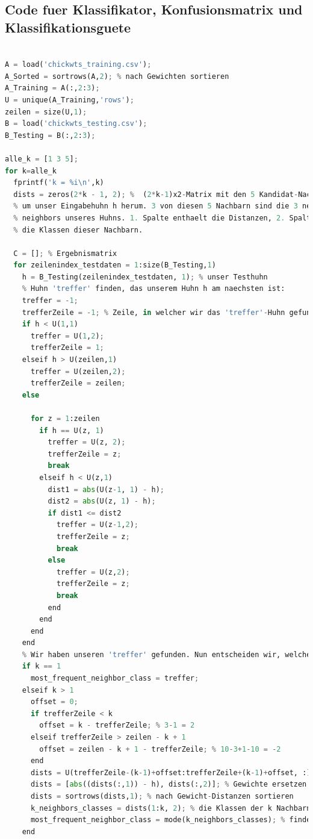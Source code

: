 \documentclass[12pt]{article}
\begin{document}
\subsection{Code fuer Klassifikator, Konfusionsmatrix und Klassifikationsguete}
\begin{lstlisting}[language=Python]
% Spalte 1 = Huhn-ID, Spalte 2 = Gewicht, Spalte 3 = Futterklasse

A = load('chickwts_training.csv');
A_Sorted = sortrows(A,2); % nach Gewichten sortieren
A_Training = A(:,2:3);
U = unique(A_Training,'rows');
zeilen = size(U,1);
B = load('chickwts_testing.csv');
B_Testing = B(:,2:3);

alle_k = [1 3 5];
for k=alle_k
  fprintf('k = %i\n',k)
  dists = zeros(2*k - 1, 2); %  (2*k-1)x2-Matrix mit den 5 Kandidat-Nachbarn 
  % um unser Eingabehuhn h herum. 3 von diesen 5 Nachbarn sind die 3 nearest 
  % neighbors unseres Huhns. 1. Spalte enthaelt die Distanzen, 2. Spalte enthaelt
  % die Klassen dieser Nachbarn.
  
  C = []; % Ergebnismatrix
  for zeilenindex_testdaten = 1:size(B_Testing,1)
    h = B_Testing(zeilenindex_testdaten, 1); % unser Testhuhn
    % Huhn 'treffer' finden, das unserem Huhn h am naechsten ist:
    treffer = -1;
    trefferZeile = -1; % Zeile, in welcher wir das 'treffer'-Huhn gefunden haben
    if h < U(1,1)
      treffer = U(1,2);
      trefferZeile = 1;
    elseif h > U(zeilen,1)
      treffer = U(zeilen,2);
      trefferZeile = zeilen;
    else
    
      for z = 1:zeilen
        if h == U(z, 1)
          treffer = U(z, 2);
          trefferZeile = z;
          break
        elseif h < U(z,1)
          dist1 = abs(U(z-1, 1) - h);
          dist2 = abs(U(z, 1) - h);
          if dist1 <= dist2
            treffer = U(z-1,2);
            trefferZeile = z;
            break
          else
            treffer = U(z,2);
            trefferZeile = z;
            break
          end
        end
      end  
    end
    % Wir haben unseren 'treffer' gefunden. Nun entscheiden wir, welche Huehner um ihn herum unsere k naechsten Nachbarn sind.
    if k == 1
      most_frequent_neighbor_class = treffer;
    elseif k > 1
      offset = 0;
      if trefferZeile < k
        offset = k - trefferZeile; % 3-1 = 2
      elseif trefferZeile > zeilen - k + 1
        offset = zeilen - k + 1 - trefferZeile; % 10-3+1-10 = -2
      end
      dists = U(trefferZeile-(k-1)+offset:trefferZeile+(k-1)+offset, :); % aus U ein Fenster der Laenge 2*k-1 um 'treffer' herum ausschneiden
      dists = [abs((dists(:,1)) - h), dists(:,2)]; % Gewichte ersetzen durch Distanzen der Gewichte zu h.
      dists = sortrows(dists,1); % nach Gewicht-Distanzen sortieren
      k_neighbors_classes = dists(1:k, 2); % die Klassen der k Nachbarn mit den kleinsten Gewicht-Distanzen holen
      most_frequent_neighbor_class = mode(k_neighbors_classes); % findet die haeufigste Klasse in k_neighbors_classes
    end
    

\end{lstlisting}
\end{document}
